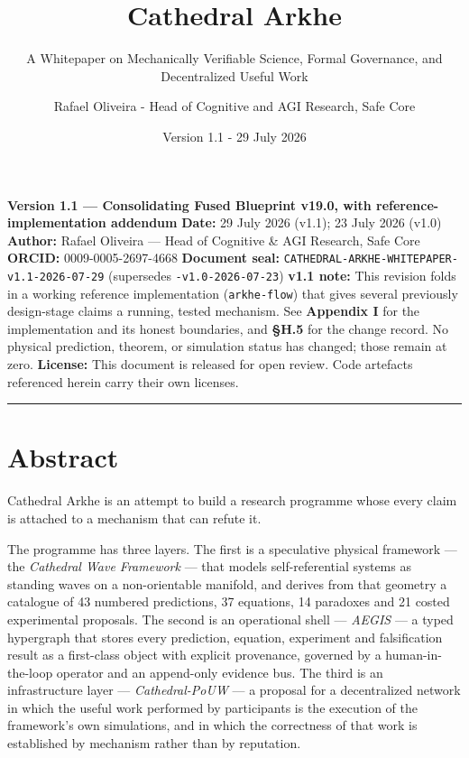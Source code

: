 \documentclass[
  11pt]{report}
\title{Cathedral Arkhe}
\subtitle{A Whitepaper on Mechanically Verifiable Science, Formal
Governance, and Decentralized Useful Work}
\author{Rafael Oliveira - Head of Cognitive and AGI Research, Safe Core}
\date{Version 1.1 - 29 July 2026}
\begin{document}
\maketitle

{
\hypersetup{linkcolor=RoyalBlue}
\setcounter{tocdepth}{2}
\tableofcontents
}
\textbf{Version 1.1 --- Consolidating Fused Blueprint v19.0, with
reference-implementation addendum} \textbf{Date:} 29 July 2026 (v1.1);
23 July 2026 (v1.0) \textbf{Author:} Rafael Oliveira --- Head of
Cognitive \& AGI Research, Safe Core \textbf{ORCID:} 0009-0005-2697-4668
\textbf{Document seal:}
\texttt{CATHEDRAL-ARKHE-WHITEPAPER-v1.1-2026-07-29} (supersedes
\texttt{-v1.0-2026-07-23}) \textbf{v1.1 note:} This revision folds in a
working reference implementation (\texttt{arkhe-flow}) that gives
several previously design-stage claims a running, tested mechanism. See
\textbf{Appendix I} for the implementation and its honest boundaries,
and \textbf{§H.5} for the change record. No physical prediction,
theorem, or simulation status has changed; those remain at zero.
\textbf{License:} This document is released for open review. Code
artefacts referenced herein carry their own licenses.

\begin{center}\rule{0.5\linewidth}{0.5pt}\end{center}

\hypertarget{abstract}{%
\chapter{Abstract}\label{abstract}}

Cathedral Arkhe is an attempt to build a research programme whose every
claim is attached to a mechanism that can refute it.

The programme has three layers. The first is a speculative physical
framework --- the \emph{Cathedral Wave Framework} --- that models
self-referential systems as standing waves on a non-orientable manifold,
and derives from that geometry a catalogue of 43 numbered predictions,
37 equations, 14 paradoxes and 21 costed experimental proposals. The
second is an operational shell --- \emph{AEGIS} --- a typed hypergraph
that stores every prediction, equation, experiment and falsification
result as a first-class object with explicit provenance, governed by a
human-in-the-loop operator and an append-only evidence bus. The third is
an infrastructure layer --- \emph{Cathedral-PoUW} --- a proposal for a
decentralized network in which the useful work performed by participants
is the execution of the framework's own simulations, and in which the
correctness of that work is established by mechanism rather than by
reputation.
\end{document}
